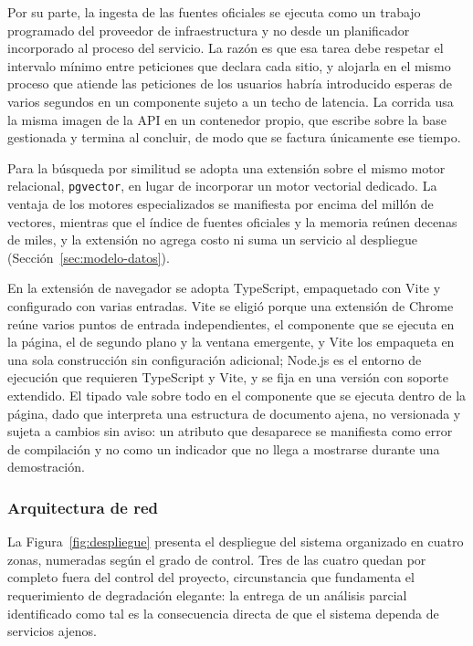 Por su parte, la ingesta de las fuentes oficiales se ejecuta como un trabajo programado del proveedor de infraestructura y no desde un planificador incorporado al proceso del servicio. La razón es que esa tarea debe respetar el intervalo mínimo entre peticiones que declara cada sitio, y alojarla en el mismo proceso que atiende las peticiones de los usuarios habría introducido esperas de varios segundos en un componente sujeto a un techo de latencia. La corrida usa la misma imagen de la API en un contenedor propio, que escribe sobre la base gestionada y termina al concluir, de modo que se factura únicamente ese tiempo.

Para la búsqueda por similitud se adopta una extensión sobre el mismo motor relacional, \texttt{pgvector}, en lugar de incorporar un motor vectorial dedicado. La ventaja de los motores especializados se manifiesta por encima del millón de vectores, mientras que el índice de fuentes oficiales y la memoria reúnen decenas de miles, y la extensión no agrega costo ni suma un servicio al despliegue (Sección~\ref{sec:modelo-datos}).

En la extensión de navegador se adopta TypeScript, empaquetado con Vite y configurado con varias entradas. Vite se eligió porque una extensión de Chrome reúne varios puntos de entrada independientes, el componente que se ejecuta en la página, el de segundo plano y la ventana emergente, y Vite los empaqueta en una sola construcción sin configuración adicional; Node.js es el entorno de ejecución que requieren TypeScript y Vite, y se fija en una versión con soporte extendido. El tipado vale sobre todo en el componente que se ejecuta dentro de la página, dado que interpreta una estructura de documento ajena, no versionada y sujeta a cambios sin aviso: un atributo que desaparece se manifiesta como error de compilación y no como un indicador que no llega a mostrarse durante una demostración.

\subsubsection{Arquitectura de red}

La Figura~\ref{fig:despliegue} presenta el despliegue del sistema organizado en cuatro zonas, numeradas según el grado de control. Tres de las cuatro quedan por completo fuera del control del proyecto, circunstancia que fundamenta el requerimiento de degradación elegante: la entrega de un análisis parcial identificado como tal es la consecuencia directa de que el sistema dependa de servicios ajenos.

